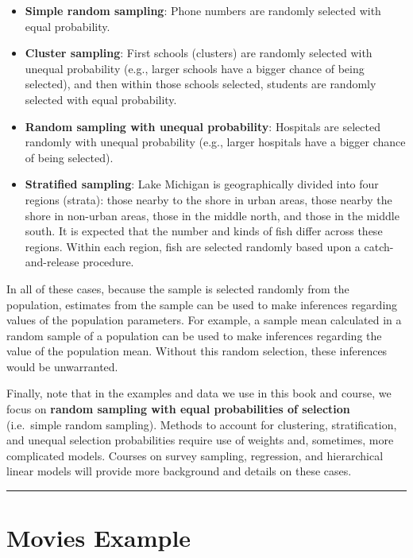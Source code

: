\documentclass[
  letterpaper,
  DIV=11,
  numbers=noendperiod]{scrreprt}
\providecommand{\tightlist}{%
  \setlength{\itemsep}{0pt}\setlength{\parskip}{0pt}}\usepackage{longtable,booktabs,array}
\theoremstyle{definition}
\theoremstyle{remark}
\begin{document}
\begin{itemize}
\tightlist
\item
  \textbf{Simple random sampling}: Phone numbers are randomly selected
  with equal probability.
\item
  \textbf{Cluster sampling}: First schools (clusters) are randomly
  selected with unequal probability (e.g., larger schools have a bigger
  chance of being selected), and then within those schools selected,
  students are randomly selected with equal probability.
\item
  \textbf{Random sampling with unequal probability}: Hospitals are
  selected randomly with unequal probability (e.g., larger hospitals
  have a bigger chance of being selected).
\item
  \textbf{Stratified sampling}: Lake Michigan is geographically divided
  into four regions (strata): those nearby to the shore in urban areas,
  those nearby the shore in non-urban areas, those in the middle north,
  and those in the middle south. It is expected that the number and
  kinds of fish differ across these regions. Within each region, fish
  are selected randomly based upon a catch-and-release procedure.
\end{itemize}

In all of these cases, because the sample is selected randomly from the
population, estimates from the sample can be used to make inferences
regarding values of the population parameters. For example, a sample
mean calculated in a random sample of a population can be used to make
inferences regarding the value of the population mean. Without this
random selection, these inferences would be unwarranted.

Finally, note that in the examples and data we use in this book and
course, we focus on \textbf{random sampling with equal probabilities of
selection} (i.e.~simple random sampling). Methods to account for
clustering, stratification, and unequal selection probabilities require
use of weights and, sometimes, more complicated models. Courses on
survey sampling, regression, and hierarchical linear models will provide
more background and details on these cases.

\begin{center}\rule{0.5\linewidth}{0.5pt}\end{center}

\hypertarget{movie-example}{%
\section{Movies Example}\label{movie-example}}
\end{document}
